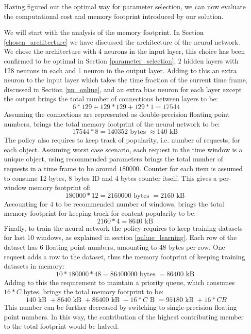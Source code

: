 Having figured out the optimal way for parameter selection, we can now evaluate the computational cost and memory footprint introduced by our solution. 

We will start with the analysis of the memory footprint. In Section \ref{chosen_architecture} we have discussed the architecture of the neural network. We chose the architecture with 4 neurons in the input layer, this choice has been confirmed to be optimal in Section \ref{parameter_selection}, 2 hidden layers with 128 neurons in each and 1 neuron in the output layer. Adding to this an extra neuron to the input layer which takes the time fraction of the current time frame, discussed in Section \ref{nn_online}, and an extra bias neuron for each layer except the  output brings the total number of connections between layers to be:
$$ 6 * 129 + 129 * 129 + 129 * 1 = 17544$$
Assuming the connections are represented as double-precision floating point numbers, brings the total memory footprint of the neural network to be:
$$ 17544 * 8 = 140352 \text{ bytes } \approx 140 \text{ kB } $$
The policy also requires to keep track of popularity, i.e. number of requests, for each object. Assuming worst case scenario, each request in the time window is a unique object, using recommended parameters brings the total number of requests in a time frame to be around $180000 $. Counter for each item is assumed to consume 12 bytes, 8 bytes ID and 4 bytes counter itself. This gives a per-window memory footprint of:
$$180000 * 12 = 2160000 \text{ bytes } = 2160 \text{ kB } $$
Account\textsl{}ing for 4 to be recommended number of  windows, brings the total memory footprint for keeping track for content popularity to be:
$$ 2160 * 4 = 8640 \text{ kB } $$
Finally, to train the neural network the policy requires to keep training datasets for last 10 windows, as explained in section \ref{online_learning}. Each row of the dataset has 6 floating point numbers, amounting to 48 bytes per row. One request adds a row to the dataset, thus the memory footprint of keeping training datasets in memory:
$$ 10 * 180000 * 48 = 86400000 \text{ bytes } = 86400 \text{ kB }$$
Adding to this the requirement to maintain a priority queue, which consumes $16 * C$ bytes, brings the total memory footprint to be:
$$ 140 \text{ kB } + 8640 \text{ kB } + 86400 \text{ kB } + 16 * C \text{ B } = 95180 \text{ kB } + 16 * C { B } $$
This number can be further decreased by switching to single-precision floating point numbers. In this way, the contribution of the highest contributing member to the total footprint would be halved.

